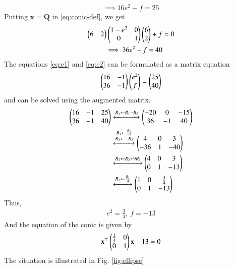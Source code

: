 \documentclass[journal,12pt,twocolumn]{IEEEtran}
\renewcommand{\vec}[1]{\boldsymbol{\mathbf{#1}}}
\begin{document}
\begin{enumerate}
\begin{align}
        \implies 16e^2 - f = 25 \label{eq:e1}
    \end{align}
    Putting $\vec{x} = \vec{Q}$ in \eqref{eq:conic-def}, we get
    \begin{align}
        \begin{pmatrix}6&2\end{pmatrix}\begin{pmatrix}1-e^2&0\\0&1\end{pmatrix}\begin{pmatrix}6\\2\end{pmatrix} + f &= 0 \\
        \implies 36e^2 - f = 40 \label{eq:e2}
    \end{align}
    The equations \eqref{eq:e1} and \eqref{eq:e2} can be formulated as
    a matrix equation
    \begin{align}
        \begin{pmatrix}16&-1\\36&-1\end{pmatrix}\begin{pmatrix}e^2\\f\end{pmatrix} = \begin{pmatrix}25\\40\end{pmatrix}
        \label{eq:mtx-eqn}
    \end{align}
    and can be solved using the augmented matrix.
    \begin{align}
        \begin{pmatrix}16&-1&25\\36&-1&40\end{pmatrix} &\xleftrightarrow[]{R_1\leftarrow R_1-R_2} \begin{pmatrix}-20&0&-15\\36&-1&40\end{pmatrix} \\
                 &\xleftrightarrow[]{\substack{R_1\leftarrow\frac{R_1}{-5}\\R_2\leftarrow -R_2}} \begin{pmatrix}4&0&3\\-36&1&-40\end{pmatrix} \\
                 &\xleftrightarrow[]{R_2\leftarrow R_2+9R_1}\begin{pmatrix}4&0&3\\0&1&-13\end{pmatrix} \\
                 &\xleftrightarrow[]{R_1\leftarrow\frac{R_1}{4}}\begin{pmatrix}1&0&\frac{3}{4}\\0&1&-13\end{pmatrix}
    \end{align}
    Thus,
    \begin{align}
        e^2 = \frac{3}{4},\ f = -13
    \end{align}
    And the equation of the conic is given by
    \begin{align}
        \vec{x}^\top\myvec{\frac{1}{4}&0\\0&1}\vec{x} - 13 = 0
    \end{align}
    The situation is illustrated in Fig. \ref{fig:ellipse}
    \begin{figure}[!ht]
        \centering

\end{figure}
\end{enumerate}
\end{document}
